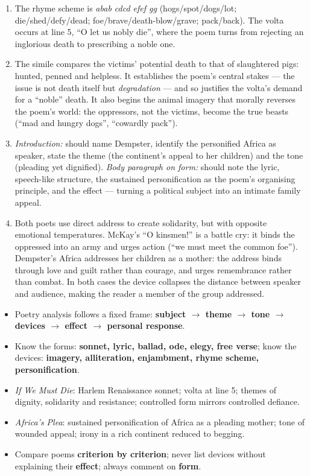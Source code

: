 \documentclass[11pt]{article}
\begin{document}
\begin{corrige}[Exercise 1]
\begin{enumerate}
\item The rhyme scheme is \emph{abab cdcd efef gg} (hogs/spot/dogs/lot; die/shed/defy/dead; foe/brave/death-blow/grave; pack/back). The volta occurs at line 5, ``O let us nobly die'', where the poem turns from rejecting an inglorious death to prescribing a noble one.
\item The simile compares the victims' potential death to that of slaughtered pigs: hunted, penned and helpless. It establishes the poem's central stakes — the issue is not death itself but \emph{degradation} — and so justifies the volta's demand for a ``noble'' death. It also begins the animal imagery that morally reverses the poem's world: the oppressors, not the victims, become the true beasts (``mad and hungry dogs'', ``cowardly pack'').
\item \emph{Introduction:} should name Dempster, identify the personified Africa as speaker, state the theme (the continent's appeal to her children) and the tone (pleading yet dignified). \emph{Body paragraph on form:} should note the lyric, speech-like structure, the sustained personification as the poem's organising principle, and the effect — turning a political subject into an intimate family appeal.
\item Both poets use direct address to create solidarity, but with opposite emotional temperatures. McKay's ``O kinsmen!'' is a battle cry: it binds the oppressed into an army and urges action (``we must meet the common foe''). Dempster's Africa addresses her children as a mother: the address binds through love and guilt rather than courage, and urges remembrance rather than combat. In both cases the device collapses the distance between speaker and audience, making the reader a member of the group addressed.
\end{enumerate}
\end{corrige}

\begin{aretenir}
\begin{itemize}
\item Poetry analysis follows a fixed frame: \textbf{subject $\to$ theme $\to$ tone $\to$ devices $\to$ effect $\to$ personal response}.
\item Know the forms: \textbf{sonnet, lyric, ballad, ode, elegy, free verse}; know the devices: \textbf{imagery, alliteration, enjambment, rhyme scheme, personification}.
\item \emph{If We Must Die}: Harlem Renaissance sonnet; volta at line 5; themes of dignity, solidarity and resistance; controlled form mirrors controlled defiance.
\item \emph{Africa's Plea}: sustained personification of Africa as a pleading mother; tone of wounded appeal; irony in a rich continent reduced to begging.
\item Compare poems \textbf{criterion by criterion}; never list devices without explaining their \textbf{effect}; always comment on \textbf{form}.
\end{itemize}
\end{aretenir}
\end{document}
